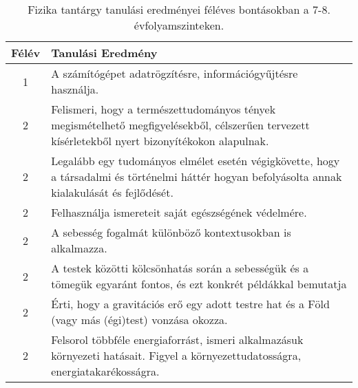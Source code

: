        
           \begin{longtable}{c | p{} }
            \caption[Fizika 7-8.]{Fizika tantárgy tanulási eredményei féléves bontásokban a 7-8. évfolyamszinteken. }  \\

            \textbf{Félév} & \textbf{Tanulási Eredmény} \\
            \hline
            \endhead
                                
                                          1 &  A számítógépet adatrögzítésre, információgyűjtésre használja. \\ \hline
                                      
                                
                                          2 &  Felismeri, hogy a természettudományos tények megismételhető megfigyelésekből, célszerűen tervezett kísérletekből nyert bizonyítékokon alapulnak. \\ \hline
                                          2 &  Legalább egy tudományos elmélet esetén végigkövette, hogy a társadalmi és történelmi háttér hogyan befolyásolta annak kialakulását és fejlődését. \\ \hline
                                          2 &  Felhasználja ismereteit saját egészségének védelmére. \\ \hline
                                          2 &  A sebesség fogalmát különböző kontextusokban is alkalmazza. \\ \hline
                                          2 &  A testek közötti kölcsönhatás során a sebességük és a tömegük egyaránt fontos, és ezt konkrét példákkal bemutatja \\ \hline
                                          2 &  Érti, hogy a gravitációs erő egy adott testre hat és a Föld (vagy más (égi)test) vonzása okozza. \\ \hline
                                          2 &  Felsorol többféle energiaforrást, ismeri alkalmazásuk környezeti hatásait. Figyel a környezettudatosságra, energiatakarékosságra. \\ \hline
                                      

\end{longtable}
